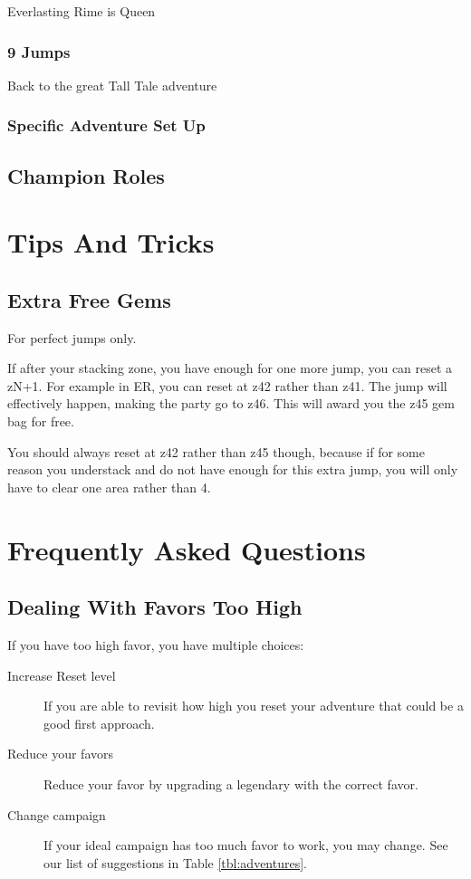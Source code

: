 \documentclass{article}
\begin{document}
Everlasting Rime is Queen

\subsubsection{9 Jumps}

Back to the great Tall Tale adventure

\subsubsection{Specific Adventure Set Up}


\subsection{Champion Roles}

\section{Tips And Tricks}

\subsection{Extra Free Gems}

For perfect jumps only.

If after your stacking zone, you have enough for one more jump, you can reset a zN+1.
For example in ER, you can reset at z42 rather than z41.
The jump will effectively happen, making the party go to z46.
This will award you the z45 gem bag for free.

You should always reset at z42 rather than z45 though, because if for some reason you understack and do not have enough for this extra jump, you will only have to clear one area rather than 4.


\section{Frequently Asked Questions}


\subsection{Dealing With Favors Too High}

If you have too high favor, you have multiple choices:
\begin{description}
    \item[Increase Reset level] If you are able to revisit how high you reset your adventure that could be a good first approach.
    \item[Reduce your favors] Reduce your favor by upgrading a legendary with the correct favor.
    \item[Change campaign] If your ideal campaign has too much favor to work, you may change.
    See our list of suggestions in Table \ref{tbl:adventures}.
\end{description}
\end{document}
